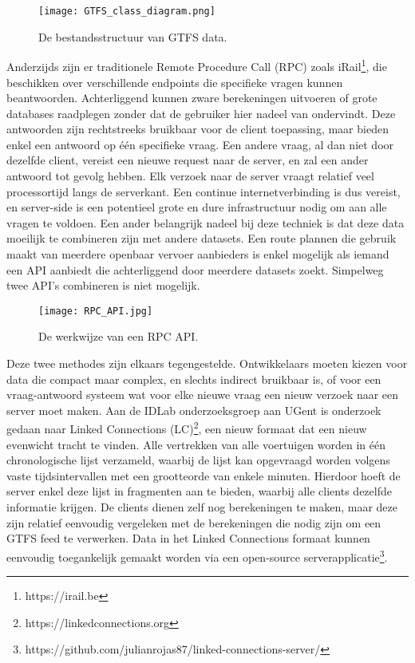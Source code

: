 \begin{figure}
	\centering
	\texttt{[image: GTFS\_class\_diagram.png]}
		\caption[GTFS structuur]{De bestandsstructuur van GTFS data.}
	\label{fig:ldfAxis}
\end{figure}
 
Anderzijds zijn er traditionele Remote Procedure Call (RPC) zoals iRail\footnote{https://irail.be}, die beschikken over verschillende endpoints die specifieke vragen kunnen beantwoorden. Achterliggend kunnen zware berekeningen uitvoeren of grote databases raadplegen zonder dat de gebruiker hier nadeel van ondervindt. Deze antwoorden zijn rechtstreeks bruikbaar voor de client toepassing, maar bieden enkel een antwoord op één specifieke vraag. Een andere vraag, al dan niet door dezelfde client, vereist een nieuwe request naar de server, en zal een ander antwoord tot gevolg hebben. Elk verzoek naar de server vraagt relatief veel processortijd langs de serverkant. Een continue internetverbinding is dus vereist, en server-side is een potentieel grote en dure infrastructuur nodig om aan alle vragen te voldoen. Een ander belangrijk nadeel bij deze techniek is dat deze data moeilijk te combineren zijn met andere datasets. Een route plannen die gebruik maakt van meerdere openbaar vervoer aanbieders is enkel mogelijk als iemand een API aanbiedt die achterliggend door meerdere datasets zoekt. Simpelweg twee API's combineren is niet mogelijk.

\begin{figure}
	\centering
	\texttt{[image: RPC\_API.jpg]}
	\caption[RPC structuur]{De werkwijze van een RPC API.}
	\label{fig:ldfAxis}
\end{figure}

Deze twee methodes zijn elkaars tegengestelde. Ontwikkelaars moeten kiezen voor data die compact maar complex, en slechts indirect bruikbaar is, of voor een vraag-antwoord systeem wat voor elke nieuwe vraag een nieuw verzoek naar een server moet maken. Aan de IDLab onderzoeksgroep aan UGent is onderzoek gedaan naar Linked Connections (LC)\footnote{https://linkedconnections.org}, een nieuw formaat dat een nieuw evenwicht tracht te vinden. Alle vertrekken van alle voertuigen worden in één chronologische lijst verzameld, waarbij de lijst kan opgevraagd worden volgens vaste tijdsintervallen met een grootteorde van enkele minuten. Hierdoor hoeft de server enkel deze lijst in fragmenten aan te bieden, waarbij alle clients dezelfde informatie krijgen. De clients dienen zelf nog berekeningen te maken, maar deze zijn relatief eenvoudig vergeleken met de berekeningen die nodig zijn om een GTFS feed te verwerken. Data in het Linked Connections formaat kunnen eenvoudig toegankelijk gemaakt worden via een open-source serverapplicatie\footnote{https://github.com/julianrojas87/linked-connections-server/}.


